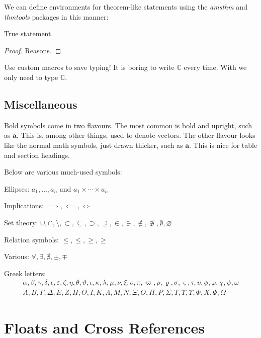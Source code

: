 \documentclass[a4paper]{memoir}
\begin{document}
We can define environments for theorem-like statements using the \emph{amsthm} and \emph{thmtools} packages in this manner:

\begin{theorem}
    True statement.
\end{theorem}

\begin{proof}
    Reasons.
\end{proof}

Use custom macros to save typing! It is boring to write \(\mathbb{C}\) every time. With
\newcommand{\C}{\mathbb{C}}
we only need to type \(\C\).


\section{Miscellaneous}
Bold symbols come in two flavours. The most common is bold and upright, such as \(\mathbf{a}\). This is, among other things, used to denote vectors. The other flavour looks like the normal math symbols, just drawn thicker, such as \(\boldsymbol{a}\). This is nice for table and section headings.

Below are various much-used symbols:

Ellipses:
\(a_1, \ldots, a_n\) and \(a_1 \times \cdots \times a_n\)

Implications: \(\implies, \impliedby, \iff\)

Set theory:
\(
    \cup, \cap, \setminus, \subset, \subseteq, \supset, \supseteq,
    \in, \ni, \notin, \not\ni, \emptyset, \varnothing
\)

Relation symbols: \(\le, \leqslant, \ge, \geqslant\)

Various: \(\forall, \exists, \nexists, \pm, \mp\)

Greek letters:
\begin{align*}
    \alpha, \beta, \gamma, \delta, \epsilon, \varepsilon, \zeta,
    \eta, \theta, \vartheta, \iota, \kappa, \lambda, \mu, \nu,
    \xi, o, \pi, \varpi, \rho, \varrho, \sigma, \varsigma, \tau,
    \upsilon, \phi, \varphi, \chi, \psi, \omega
    \\
    A, B, \Gamma, \Delta, E, Z, H, \Theta, I, K, \Lambda, M, N, \Xi,
    O, \Pi, P, \Sigma, T, \Upsilon, \varUpsilon, \Phi, X, \Psi, \Omega
\end{align*}


\chapter{Floats and Cross References}
\end{document}
